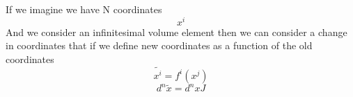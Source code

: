 



\section{}
If we imagine we have N coordinates 
\begin{equation}
x^i 
\end{equation}
And we consider an infinitesimal volume element then we can consider a change in coordinates that if we define new coordinates as a function of the old coordinates
\begin{equation}
\widetilde{x^i} = f^i(x^j)
\end{equation}
\begin{equation}
d^n \widetilde{x} = d^nx J
\end{equation}


